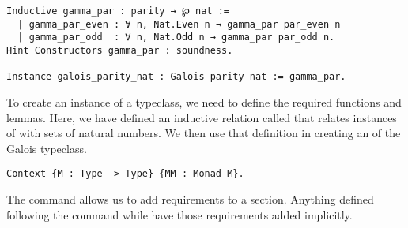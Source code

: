 \begin{verbatim}
Inductive gamma_par : parity → ℘ nat :=
  | gamma_par_even : ∀ n, Nat.Even n → gamma_par par_even n
  | gamma_par_odd  : ∀ n, Nat.Odd n → gamma_par par_odd n.
Hint Constructors gamma_par : soundness.

Instance galois_parity_nat : Galois parity nat := gamma_par.
\end{verbatim}

To create an instance of a typeclass, we need to define the required functions
and lemmas. Here, we have defined an inductive relation called 
that relates instances of  with sets of natural numbers. 
We then use that definition in creating an  of the Galois typeclass.

\begin{verbatim}
Context {M : Type -> Type} {MM : Monad M}.
\end{verbatim}

The  command allows us to add requirements to a section. Anything
defined following the command while have those requirements added implicitly.
